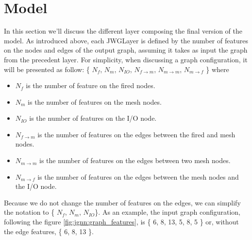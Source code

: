 \documentclass[../main.tex]{subfiles}
\begin{document}
\section{Model}

In this section we'll discuss the different layer composing the final version of the model. As introduced above, each JWGLayer is defined by the number of features on the nodes and edges of the output graph, assuming it takes as input the graph from the precedent layer. For simplicity, when discussing a graph configuration, it will be presented as follow: \{ {\color{red} $N_{f}$},  {\color{Dandelion} $N_{m}$}, {\color{blue} $N_{IO}$}, $N_{f\rightarrow m}$, $N_{m \rightarrow m}$, $N_{m \rightarrow f}$ \} where
\begin{itemize}
  \item {\color{red} $N_{f}$} is the number of feature on the fired nodes.
  \item {\color{Dandelion} $N_{m}$} is the number of features on the mesh nodes.
  \item {\color{blue} $N_{IO}$} is the number of features on the I/O node.
  \item $N_{f\rightarrow m}$ is the number of features on the edges between the fired and mesh nodes.
  \item $N_{m \rightarrow m}$ is the number of features on the edges between two mesh nodes.
  \item $N_{m \rightarrow f}$ is the number of features on the edges between the mesh nodes and the I/O node.
\end{itemize}

Because we do not change the number of features on the edges, we can simplify the notation to \{{\color{red} $N_{f}$}, {\color{Dandelion} $N_{m}$}, {\color{blue} $N_{IO}$}\}. As an example, the input graph configuration, following the figure \ref{fig:jgnn:graph_features}, is \{{\color{red} 6}, {\color{Dandelion} 8}, {\color{blue} 13}, 5, 8, 5 \} or, without the edge features, \{{\color{red} 6}, {\color{Dandelion} 8}, {\color{blue} 13} \}.
\end{document}
